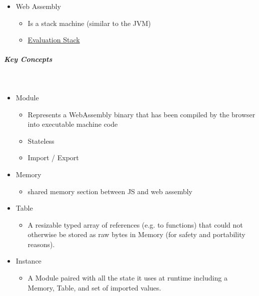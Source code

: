 \documentclass[10pt,twoside,landscape]{article}
\begin{document}
\begin{multicols}{4}
\begin{itemize}
\item Web Assembly
\begin{itemize}
\item Is a stack machine (similar to the JVM)
\item \href{../../../roam/20221230171752-what_is_a_evaluation_stack.org}{Evaluation Stack}
\end{itemize}
\end{itemize}
\subparagraph{Key Concepts} \
\label{sec:orgf0b797d}
\begin{itemize}
\item Module
\begin{itemize}
\item Represents a WebAssembly binary that has been compiled by the browser into executable machine code
\item Stateless
\item Import / Export
\end{itemize}
\item Memory
\begin{itemize}
\item shared memory section between JS and web assembly
\end{itemize}
\item Table
\begin{itemize}
\item A resizable typed array of references (e.g. to functions) that could not otherwise be stored as raw bytes in Memory (for safety and portability reasons).
\end{itemize}
\item Instance
\begin{itemize}
\item A Module paired with all the state it uses at runtime including a Memory, Table, and set of imported values.
\end{itemize}
\end{itemize}


\end{multicols}
\end{document}
